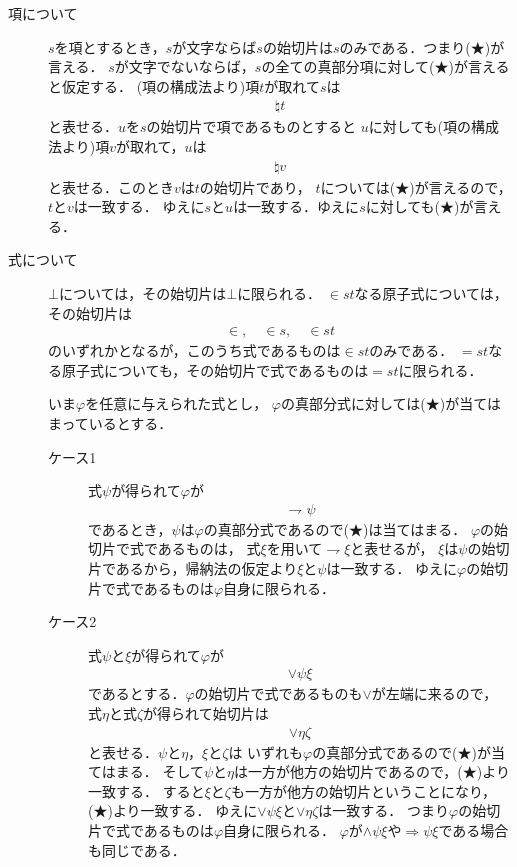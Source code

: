 	\begin{metaprf}\mbox{}
		\begin{description}
			\item[項について]
				$s$を項とするとき，$s$が文字ならば$s$の始切片は$s$のみである．つまり(★)が言える．
				$s$が文字でないならば，$s$の全ての真部分項に対して(★)が言えると仮定する．
				(項の構成法より)項$t$が取れて$s$は
				\begin{align}
					\natural t
				\end{align}
				と表せる．$u$を$s$の始切片で項であるものとすると
				$u$に対しても(項の構成法より)項$v$が取れて，$u$は
				\begin{align}
					\natural v
				\end{align}
				と表せる．このとき$v$は$t$の始切片であり，
				$t$については(★)が言えるので，$t$と$v$は一致する．
				ゆえに$s$と$u$は一致する．ゆえに$s$に対しても(★)が言える．
				
			\item[式について]
			
	$\bot$については，その始切片は$\bot$に限られる．
	$\in st$なる原子式については，その始切片は
	\begin{align}
		\in, \quad \in s, \quad \in st
	\end{align}
	のいずれかとなるが，このうち式であるものは$\in st$のみである．
	$=st$なる原子式についても，その始切片で式であるものは$=st$に限られる．
	
	いま$\varphi$を任意に与えられた式とし，
	$\varphi$の真部分式に対しては(★)が当てはまっているとする．
	\begin{description}
		\item[ケース1] 式$\psi$が得られて$\varphi$が
			\begin{align}
				\rightharpoondown \psi
			\end{align}
			であるとき，$\psi$は$\varphi$の真部分式であるので(★)は当てはまる．
			$\varphi$の始切片で式であるものは，
			式$\xi$を用いて$\rightharpoondown \xi$と表せるが，
			$\xi$は$\psi$の始切片であるから，帰納法の仮定より$\xi$と$\psi$は一致する．
			ゆえに$\varphi$の始切片で式であるものは$\varphi$自身に限られる．
			
		\item[ケース2] 式$\psi$と$\xi$が得られて$\varphi$が
			\begin{align}
				\vee \psi \xi
			\end{align}
			であるとする．$\varphi$の始切片で式であるものも$\vee$が左端に来るので，
			式$\eta$と式$\zeta$が得られて始切片は
			\begin{align}
				\vee \eta \zeta
			\end{align}
			と表せる．$\psi$と$\eta$，$\xi$と$\zeta$は
			いずれも$\varphi$の真部分式であるので(★)が当てはまる．
			そして$\psi$と$\eta$は一方が他方の始切片であるので，(★)より一致する．
			すると$\xi$と$\zeta$も一方が他方の始切片ということになり，(★)より一致する．
			ゆえに$\vee \psi \xi$と$\vee \eta \zeta$は一致する．
			つまり$\varphi$の始切片で式であるものは$\varphi$自身に限られる．
			$\varphi$が$\wedge \psi \xi$や$\Longrightarrow \psi \xi$である場合も同じである．
			

\end{description}
\end{description}
\end{metaprf}
